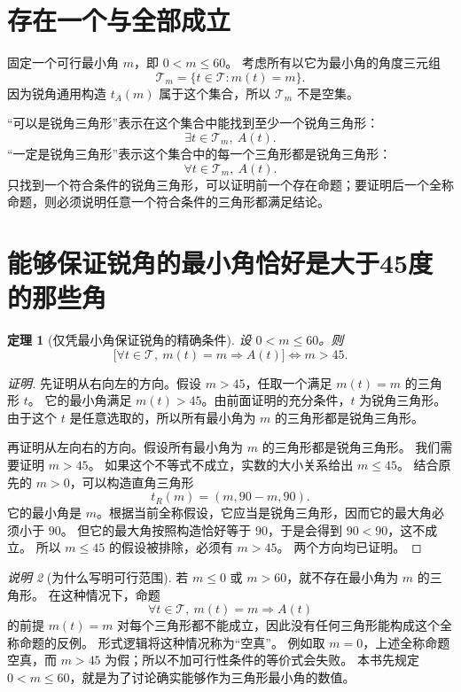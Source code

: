 \documentclass[UTF8,a4paper,zihao=-4,oneside,openany,fontset=fandol]{ctexbook}
\newtheorem{theorem}{定理}[chapter]
\theoremstyle{definition}
\theoremstyle{remark}
\newtheorem{remark}[theorem]{说明}
\begin{document}
\section{存在一个与全部成立}

固定一个可行最小角 $m$，即 $0<m\le60$。
考虑所有以它为最小角的角度三元组
\[
\mathcal T_m=\{t\in\mathcal T:m(t)=m\}.
\]
因为锐角通用构造 $t_A(m)$ 属于这个集合，所以 $\mathcal T_m$ 不是空集。

“可以是锐角三角形”表示在这个集合中能找到至少一个锐角三角形：
\[
\exists t\in\mathcal T_m,\ A(t).
\]
“一定是锐角三角形”表示这个集合中的每一个三角形都是锐角三角形：
\[
\forall t\in\mathcal T_m,\ A(t).
\]
只找到一个符合条件的锐角三角形，可以证明前一个存在命题；要证明后一个全称命题，则必须说明任意一个符合条件的三角形都满足结论。

\section{能够保证锐角的最小角恰好是大于45度的那些角}

\begin{theorem}[仅凭最小角保证锐角的精确条件]
设 $0<m\le60$。则
\[
\bigl[\forall t\in\mathcal T,\ m(t)=m\Longrightarrow A(t)\bigr]
\Longleftrightarrow m>45.
\]
\end{theorem}

\begin{proof}[证明]
先证明从右向左的方向。假设 $m>45$，任取一个满足 $m(t)=m$ 的三角形 $t$。
它的最小角满足 $m(t)>45$。由前面证明的充分条件，$t$ 为锐角三角形。
由于这个 $t$ 是任意选取的，所以所有最小角为 $m$ 的三角形都是锐角三角形。

再证明从左向右的方向。假设所有最小角为 $m$ 的三角形都是锐角三角形。
我们需要证明 $m>45$。
如果这个不等式不成立，实数的大小关系给出 $m\le45$。
结合原先的 $m>0$，可以构造直角三角形
\[
t_R(m)=(m,90-m,90).
\]
它的最小角是 $m$。根据当前全称假设，它应当是锐角三角形，因而它的最大角必须小于 $90$。
但它的最大角按照构造恰好等于 $90$，于是会得到 $90<90$，这不成立。
所以 $m\le45$ 的假设被排除，必须有 $m>45$。
两个方向均已证明。
\end{proof}

\begin{remark}[为什么写明可行范围]
若 $m\le0$ 或 $m>60$，就不存在最小角为 $m$ 的三角形。
在这种情况下，命题
\[
\forall t\in\mathcal T,\ m(t)=m\Longrightarrow A(t)
\]
的前提 $m(t)=m$ 对每个三角形都不能成立，因此没有任何三角形能构成这个全称命题的反例。
形式逻辑将这种情况称为“空真”。
例如取 $m=0$，上述全称命题空真，而 $m>45$ 为假；所以不加可行性条件的等价式会失败。
本书先规定 $0<m\le60$，就是为了讨论确实能够作为三角形最小角的数值。
\end{remark}
\end{document}

